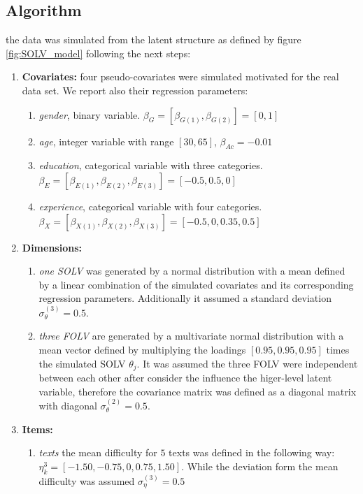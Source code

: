 \subsection{Algorithm} \label{sub_sect:algorithm}

the data was simulated from the latent structure as defined by figure \ref{fig:SOLV_model} following the next steps:

\begin{enumerate}	
	\item \textbf{Covariates:} four pseudo-covariates were simulated motivated for the real data set. We report also their regression parameters:
	\begin{enumerate}
		\item \textit{gender}, binary variable. $\beta_{G}=[\beta_{G(1)}, \beta_{G(2)}] = [0, 1]$
		\item \textit{age}, integer variable with range $[30, 65]$, $\beta_{Ac} = -0.01$
		\item \textit{education}, categorical variable with three categories. $\beta_{E}=[\beta_{E(1)}, \beta_{E(2)}, \beta_{E(3)}] = [-0.5, 0.5, 0]$
		\item \textit{experience}, categorical variable with four categories. $\beta_{X}=[\beta_{X(1)}, \beta_{X(2)}, \beta_{X(3)}] = [-0.5, 0, 0.35, 0.5]$
	\end{enumerate}
	\item \textbf{Dimensions:} 
	\begin{enumerate}
		\item \textit{one SOLV} was generated by a normal distribution with a mean defined by a linear combination of the simulated covariates and its corresponding regression parameters. Additionally it assumed a standard deviation $\sigma^{(3)}_{\theta}=0.5$.
		\item \textit{three FOLV} are generated by a multivariate normal distribution with a mean vector defined by multiplying the loadings $[0.95, 0.95, 0.95]$ times the simulated SOLV $\theta_{j}$. It was assumed the three FOLV were independent between each other after consider the influence the higer-level latent variable, therefore the covariance matrix was defined as a diagonal matrix with diagonal $\sigma^{(2)}_{\theta}=0.5$.
	\end{enumerate}
	\item \textbf{Items:} 
	\begin{enumerate}
		\item \textit{texts} the mean difficulty for $5$ texts was defined in the following way: $\eta^{3}_{k} = [-1.50, -0.75, 0, 0.75, 1.50]$. While the deviation form the mean difficulty was assumed $\sigma^{(3)}_{\eta}=0.5$

\end{enumerate}
\end{enumerate}
